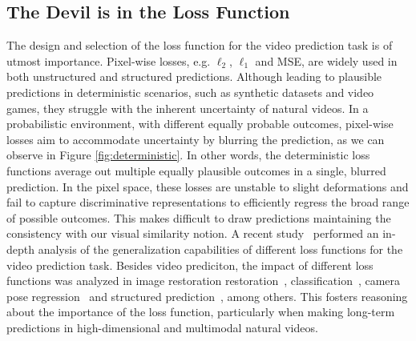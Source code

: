 \subsection{The Devil is in the Loss Function}
The design and selection of the loss function for the video prediction task is of utmost importance. Pixel-wise losses, e.g. $\ell_2$, $\ell_1$ and \ac{MSE}, are widely used in both unstructured and structured predictions. Although leading to plausible predictions in deterministic scenarios, such as synthetic datasets and video games, they struggle with the inherent uncertainty of natural videos. In a probabilistic environment, with different equally probable outcomes, pixel-wise losses aim to accommodate uncertainty by blurring the prediction, as we can observe in Figure \ref{fig:deterministic}. In other words, the deterministic loss functions average out multiple equally plausible outcomes in a single, blurred prediction. In the pixel space, these losses are unstable to slight deformations and fail to capture discriminative representations to efficiently regress the broad range of possible outcomes. This makes difficult to draw predictions maintaining the consistency with our visual similarity notion. A recent study~\cite{Aigner2020} performed an in-depth analysis of the generalization capabilities of different loss functions for the video prediction task. Besides video prediciton, the impact of different loss functions was analyzed in image restoration restoration~\cite{Zhao2017}, classification~\cite{Janocha2017}, camera pose regression~\cite{Kendall2017} and structured prediction~\cite{Hwang2019}, among others. This fosters reasoning about the importance of the loss function, particularly when making long-term predictions in high-dimensional and multimodal natural videos.

